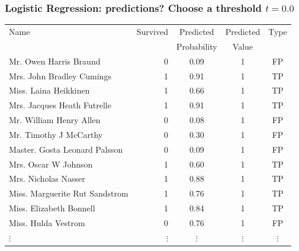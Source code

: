 \documentclass[aspectratio=169]{beamer}
\theoremstyle{principle}
\begin{document}
\begin{frame}
\frametitle{Logistic Regression: predictions?  Choose a threshold $t = 0.0$}

\begin{table}[ht]
\centering
\begin{tabular}{l | r | c | c | c}

 Name & Survived & Predicted & Predicted & Type\\ 
&&Probability&Value\\
  \hline
  \hline
 Mr. Owen Harris Braund &   0 & 0.09 & 1 & FP\\ 
 Mrs. John Bradley Cumings &   1 & 0.91 & 1& TP\\ 
 Miss. Laina Heikkinen &   1 & 0.66 & 1& TP\\ 
 Mrs. Jacques Heath Futrelle &   1 & 0.91 & 1& TP\\ 
 Mr. William Henry Allen &   0 & 0.08 & 1& FP\\ 
 Mr. Timothy J McCarthy &   0 & 0.30 & 1& FP\\ 
 Master. Gosta Leonard Palsson &   0 & 0.09 & 1& FP\\ 
 Mrs. Oscar W Johnson &   1 & 0.60 & 1& TP\\ 
 Mrs. Nicholas Nasser &   1 & 0.88 & 1& TP\\ 
 Miss. Marguerite Rut Sandstrom &   1 & 0.76 & 1& TP\\ 
 Miss. Elizabeth Bonnell &   1 & 0.84 &1 & TP\\ 
 Miss. Hulda Vestrom &   0 & 0.76 &1& FP\\ 
$\vdots$ & $\vdots$ & $\vdots$ & $\vdots$ & $\vdots$
\end{tabular}
\end{table}

\end{frame}
\end{document}
